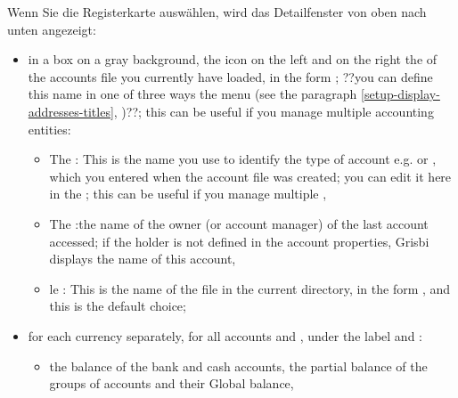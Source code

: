 Wenn Sie die Registerkarte  auswählen, wird das Detailfenster von oben nach unten angezeigt:%
\begin{itemize}
	 \item in a box on a gray background, the  icon on the left and on the right the  of the accounts file you currently have loaded, in the form   ; ??you can define this name in one of three ways the  menu (see the paragraph \vref{setup-display-addresses-titles}, )??; this can be useful if you manage multiple accounting entities:

		\begin{itemize}
			 \item The : This is the name you use to identify the type of account e.g.   or  , which you entered when the account file was created; you can edit it here in the   ; this can be useful if you manage multiple  , 
			 \item The :the name of the owner (or  account manager) of the last account accessed; if the holder is not defined in the account properties, Grisbi displays the name of this account,
			 \item le :  This is the name of the file in the current directory, in the form  , and this is the default choice;
		\end{itemize}
		
	 \item for each currency separately, for all accounts and ,  under the label  and :
		\begin{itemize}
			 \item the balance of the bank and cash accounts, the partial balance of the groups of accounts and their Global balance,


\end{itemize}
\end{itemize}
